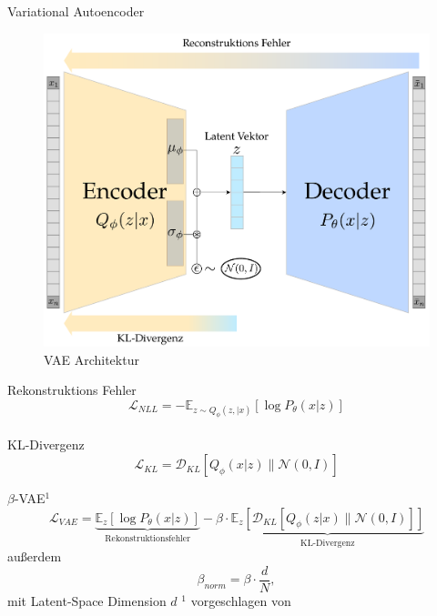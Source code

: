 \documentclass[10pt, compress]{beamer}
\begin{document}
\begin{frame}{Variational Autoencoder}
  \begin{minipage}[c]{.5\textwidth}
    \begin{figure}[hbt]
      \includegraphics[width=\textwidth]{gfx/literature/VAE Architecture}
      \caption{VAE Architektur}
    \end{figure}
  \end{minipage}
  \hfill
  \begin{minipage}[c]{.45\textwidth}
    Rekonstruktions Fehler
    \begin{equation*}
      \mathcal{L}_{NLL} = - \mathbb{E}_{z \sim Q_\phi(z, \vert x)} \left[ \log P_\theta(x \vert z) \right]
    \end{equation*}
    \\
    KL-Divergenz
    \begin{equation*}
      \mathcal{L}_{KL} = \mathcal{D}_{KL}\left[ Q_\phi(x \vert z) \| \mathcal{N}(0, I) \right]
    \end{equation*}
  \end{minipage}
\end{frame}

\begin{frame}{$\beta$-VAE$^1$}
  \begin{equation}
    \mathcal{L}_{VAE} = \underbrace{\mathbb{E}_z \left[ \log P_\theta(x \vert z)\right]}_{\text{Rekonstruktionsfehler}} - \beta \cdot \underbrace{\mathbb{E}_z \left[ \mathcal{D}_{KL}\left[ Q_\phi(z \vert x) \| \mathcal{N}(0, I) \right] \right]}_{\text{KL-Divergenz}}
  \end{equation}
  \vfill
  außerdem
  \begin{equation}
    \beta_{norm} = \beta \cdot \frac{d}{N}, 
  \end{equation}
  mit Latent-Space Dimension $d$
  \vfill
{\tiny $^1$ vorgeschlagen von \cite{Higgins2017}}
\end{frame}
\end{document}
